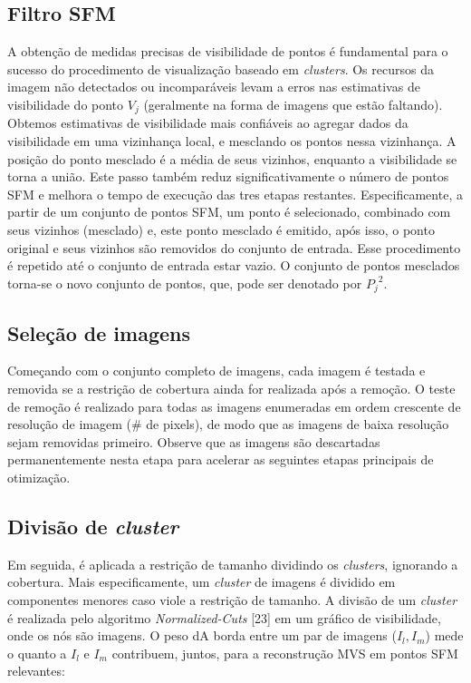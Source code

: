 \begin{itemize}
\subsection{Filtro SFM}
A obtenção de medidas precisas de visibilidade de pontos é fundamental para o sucesso do procedimento de visualização baseado em {\it clusters}. Os recursos da imagem não detectados ou incomparáveis levam a erros nas estimativas de visibilidade do ponto $V_j$ (geralmente na forma de imagens que estão faltando). Obtemos estimativas de visibilidade mais confiáveis ao agregar dados da visibilidade em uma vizinhança local, e mesclando os pontos nessa vizinhança. A posição do ponto mesclado é a média de seus vizinhos, enquanto a visibilidade se torna a união. Este passo também reduz significativamente o número de pontos SFM e melhora o tempo de execução das tres etapas restantes. Especificamente, a partir de um conjunto de pontos SFM, um ponto é selecionado, combinado com seus vizinhos (mesclado) e, este ponto mesclado é emitido, após isso, o ponto original e seus vizinhos são removidos do conjunto de entrada. Esse procedimento é repetido até o conjunto de entrada estar vazio. O conjunto de pontos mesclados torna-se o novo conjunto de pontos, que, pode ser denotado por ${P_j}^2$. %

\subsection{Seleção de imagens}
Começando com o conjunto completo de imagens, cada imagem é testada e removida se a restrição de cobertura ainda for realizada após a remoção. O teste de remoção é realizado para todas as imagens enumeradas em ordem crescente de resolução de imagem (\# de pixels), de modo que as imagens de baixa resolução sejam removidas primeiro. Observe que as imagens são descartadas permanentemente nesta etapa para acelerar as seguintes etapas principais de otimização.

\subsection{Divisão de {\it cluster}}
Em seguida, é aplicada a restrição de tamanho dividindo os {\it clusters}, ignorando a cobertura. Mais especificamente, um {\it cluster} de imagens é dividido em componentes menores caso viole a restrição de tamanho. A divisão de um {\it cluster} é realizada pelo algoritmo {\it Normalized-Cuts} %
[23] em um gráfico de visibilidade, onde os nós são imagens. O peso dA borda entre um par de imagens ($I_l, I_m$) mede o quanto a $I_l$ e $I_m$ contribuem, juntos,  para a reconstrução MVS em pontos SFM relevantes: 


\end{itemize}
